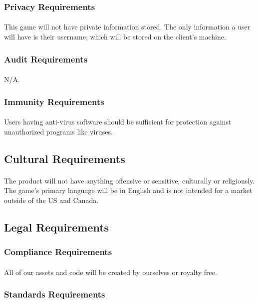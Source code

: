 \documentclass[12pt, titlepage]{article}
\begin{document}
\subsubsection{Privacy Requirements}
\paragraph{}This game will not have private information stored. The only information a user will have is their username, which will be stored on the client's machine.
\subsubsection{Audit Requirements}
\paragraph{}N/A.
\subsubsection{Immunity Requirements}
\paragraph{}Users having anti-virus software should be sufficient for protection against unauthorized programs like viruses.
\subsection{Cultural Requirements}
\paragraph{}The product will not have anything offensive or sensitive, culturally or religiously. The game's primary language will be in English and is not intended for a market outside of the US and Canada.
\subsection{Legal Requirements}
\subsubsection{Compliance Requirements}
\paragraph{}All of our assets and code will be created by ourselves or royalty free.
\subsubsection{Standards Requirements}
\end{document}
